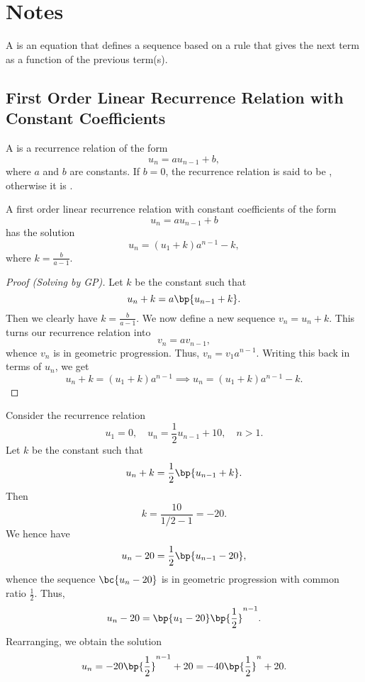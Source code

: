 \section{Notes}

\begin{definition}
    A  is an equation that defines a sequence based on a rule that gives the next term as a function of the previous term(s).
\end{definition}

\subsection{First Order Linear Recurrence Relation with Constant Coefficients}

\begin{definition}
    A  is a recurrence relation of the form \[u_n = a u_{n-1} + b,\] where $a$ and $b$ are constants. If $b = 0$, the recurrence relation is said to be , otherwise it is .
\end{definition}

\begin{proposition}
    A first order linear recurrence relation with constant coefficients of the form \[u_n = au_{n-1} + b\] has the solution \[u_n = (u_1 + k) a^{n-1} - k,\] where $k = \frac{b}{a - 1}$.
\end{proposition}
\begin{proof}[Proof (Solving by GP)]
    Let $k$ be the constant such that \[u_n + k = a\bp{u_{n-1} + k}.\] Then we clearly have $k = \frac{b}{a - 1}$. We now define a new sequence $v_n = u_n + k$. This turns our recurrence relation into \[v_n = av_{n-1},\] whence $v_n$ is in geometric progression. Thus, $v_n = v_1 a^{n-1}$. Writing this back in terms of $u_n$, we get \[u_n + k = (u_1 + k) a^{n-1} \implies u_n = (u_1 + k)a^{n-1} - k.\]
\end{proof}

\begin{example}[Solving by GP]
    Consider the recurrence relation \[u_1 = 0, \quad u_n = \frac12 u_{n-1} + 10, \quad n > 1.\] Let $k$ be the constant such that \[u_n + k = \frac12 \bp{u_{n-1} + k}.\] Then \[k = \frac{10}{1/2 - 1} = -20.\] We hence have \[u_n - 20 = \frac12 \bp{u_{n-1} - 20},\] whence the sequence $\bc{u_n - 20}$ is in geometric progression with common ratio $\frac12$. Thus, \[u_n - 20 = \bp{u_1 - 20} \bp{\frac12}^{n-1}.\] Rearranging, we obtain the solution \[u_n = -20 \bp{\frac12}^{n-1} + 20 = -40 \bp{\frac12}^n + 20.\]
\end{example}

